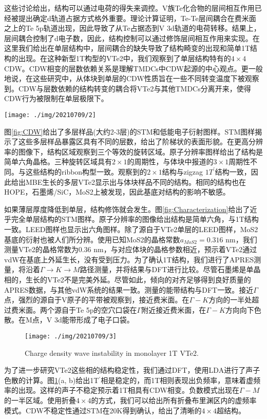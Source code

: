 \documentclass[reprint, aps, prb, showkeys]{revtex4-2}
\begin{document}
这些讨论给出，结构可以通过电荷的得失来调控。V族Te化合物的层间相互作用已经被提出确定d轨道占据方式格外重要。理论计算证明，Te-Te层间耦合在费米面之上的Te 5p轨道出现，因此导致了从Te占据态到V 3d轨道的电荷转移。结果上，层间耦合控制了d电子数，因此，结构控制可以通过修饰层间相互作用来实现。在这里我们给出在单层结构中，层间耦合的缺失导致了结构畸变的出现和简单1T结构的出现。在这种新型1T构型的VTe2中，我们观察到了单层结构特有的$4 \times 4$CDW。CDW相变的层数依赖关系是理解TMDCs中CDW起源的中心观点。更一般地说，在这些研究中，从体块到单层的CDW性质旨在一些不同转变温度下被观察到。CDW与层数依赖的结构转变的耦合将VTe2与其他TMDCs分离开来，使得CDW行为被限制在单层极限下。
\begin{figure*}[t]
    \texttt{[image: ./img/20210709/2]}
    \caption{\label{fig:Characterization} 
    Characterization of monolayer VTe2
    }
\end{figure*}

图\ref{fig:CDW}给出了多层样品(大约2-3层)的STM和低能电子衍射图样。STM图样揭示了这些多层样品暴露区具有不同的层数，给出了阶梯状的表面形貌。在更高分辨率的图像下，结构区域观察到三个等效的旋转区域。原子分辨率图样给出了结构是简单六角晶格。三种旋转区域具有$2 \times 1$的周期性，与体块中报道的$3 \times 1$周期性不同。与这些结构的ribbon构型一致。观察到的$2 \times 1$结构与zigzag $1T^{'}$结构一致，因此给出MBE生长的多层VTe2显示出与体块样品不同的结构。相同的结构也在HOPE，石墨烯/SiC，MoS2上被发现，因此基底对结构的影响不敏感。

如果薄层厚度降低到单层，结构修饰就会发生。图\ref{fig:Characterization}给出了近乎完全单层结构的STM图样。原子分辨率的图像给出结构是简单六角，与1T结构一致。LEED图样也显示出六角图样。除了源自于VTe2单层的LEED图样，MoS2基底的衍射也被人们所分辨。使用已知MoS2的晶格常数$a_{MoS2} = 0.316$ nm，我们测量VTe2的晶格常数为0.36 nm，与对应体块的晶格参数相近，预示着VTe2通过vdW在基底上外延生长，没有受到压力。为了确认1T结构，我们进行了APRES测量，将沿着$\Gamma \rightarrow K \rightarrow M$路径测量，并将结果与DFT进行比较。尽管石墨烯是单晶相的，生长的VTe2不是完美外延。尽管如此，倾向的对齐足够得到良好质量的APRES数据，与其他vdW系统的结果一致。测量的能带结构与DFT一致。接近$\Gamma$点，强烈的源自于V原子的平带被观察到，接近费米面。在$\Gamma - K$方向的一半处超过费米面。两个源自于Te 5p的空穴口袋在$\Gamma$附近接近费米面，在$\Gamma - K$方向向下色散。在M点，V 3d能带形成了电子口袋。

\begin{figure}[t]
    \texttt{[image: ./img/20210709/3]}
    \caption{\label{fig:Phonon} 
    Charge density wave instability in monolayer 1T VTe2.
    }
\end{figure}

为了进一步研究VTe2这些相的结构稳定性，我们通过DFT，使用LDA进行了声子色散的计算。图\ref{fig:Phonon}(a, b)给出1T$^{'}$相是稳定的，而1T相则表现出负频率，意味着虚频率的出现。这样的声子不稳定预示着1T相具有CDW相变。负数模式出现在$\Gamma - M$的一半区域。使用折叠$4 \times 4$的方式，我们可以给出所有折叠布里渊区内的虚频率模式。CDW不稳定性通过STM在20K得到确认，给出了清晰的$4 \times 4$超结构。
\end{document}
